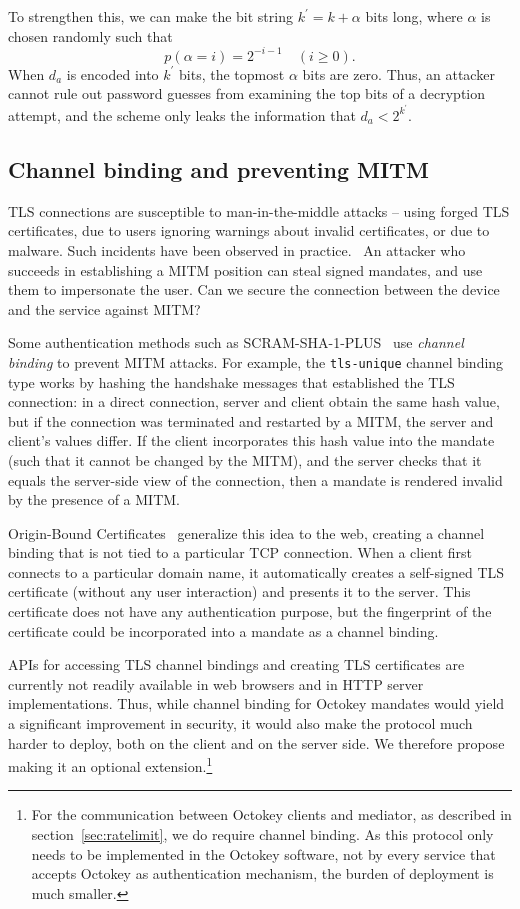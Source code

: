 To strengthen this, we can make the bit string $k^\prime = k + \alpha$ bits long, where $\alpha$ is
chosen randomly such that $$p(\alpha = i) = 2^{-i-1} \quad (i \ge 0).$$ When $d_a$ is encoded into
$k^\prime$ bits, the topmost $\alpha$ bits are zero. Thus, an attacker cannot rule out password
guesses from examining the top bits of a decryption attempt, and the scheme only leaks the
information that $d_a < 2^{k^\prime}$.

\subsection{Channel binding and preventing MITM}\label{sec:channelbinding}

TLS connections are susceptible to man-in-the-middle attacks -- using forged TLS certificates, due
to users ignoring warnings about invalid certificates, or due to malware. Such incidents have been
observed in practice.~\cite{Huang14, Adkins11} An attacker who succeeds in establishing a MITM
position can steal signed mandates, and use them to impersonate the user. Can we secure the
connection between the device and the service against MITM?

Some authentication methods such as SCRAM-SHA-1-PLUS~\cite{SCRAM} use \emph{channel binding} to
prevent MITM attacks. For example, the \texttt{tls-unique} channel binding type works by hashing the
handshake messages that established the TLS connection: in a direct connection, server and client
obtain the same hash value, but if the connection was terminated and restarted by a MITM, the server
and client's values differ. If the client incorporates this hash value into the mandate (such that
it cannot be changed by the MITM), and the server checks that it equals the server-side view of the
connection, then a mandate is rendered invalid by the presence of a MITM.

Origin-Bound Certificates~\cite{Dietz12} generalize this idea to the web, creating a channel
binding that is not tied to a particular TCP connection. When a client first connects to a
particular domain name, it automatically creates a self-signed TLS certificate (without any user
interaction) and presents it to the server. This certificate does not have any authentication
purpose, but the fingerprint of the certificate could be incorporated into a mandate as a channel
binding.

APIs for accessing TLS channel bindings and creating TLS certificates are currently not readily
available in web browsers and in HTTP server implementations. Thus, while channel binding for
Octokey mandates would yield a significant improvement in security, it would also make the protocol
much harder to deploy, both on the client and on the server side. We therefore propose making it an
optional extension.\footnote{For the communication between Octokey clients and mediator, as
described in section~\ref{sec:ratelimit}, we do require channel binding. As this protocol only needs
to be implemented in the Octokey software, not by every service that accepts Octokey as
authentication mechanism, the burden of deployment is much smaller.}

